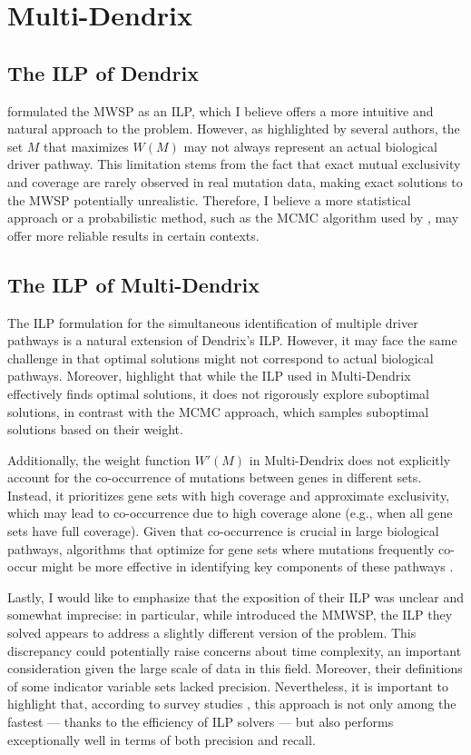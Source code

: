 \section{Multi-Dendrix}

\subsection{The ILP of Dendrix}

\textcite{multi-dendrix} formulated the MWSP as an ILP, which I believe offers a more intuitive and natural approach to the problem. However, as highlighted by several authors, the set $M$ that maximizes $W(M)$ may not always represent an actual biological driver pathway. This limitation stems from the fact that exact mutual exclusivity and coverage are rarely observed in real mutation data, making exact solutions to the MWSP potentially unrealistic. Therefore, I believe a more statistical approach or a probabilistic method, such as the MCMC algorithm used by \textcite{dendrix}, may offer more reliable results in certain contexts.

\subsection{The ILP of Multi-Dendrix}

The ILP formulation for the simultaneous identification of multiple driver pathways is a natural extension of Dendrix's ILP. However, it may face the same challenge in that optimal solutions might not correspond to actual biological pathways. Moreover, \textcite{multi-dendrix} highlight that while the ILP used in Multi-Dendrix effectively finds optimal solutions, it does not rigorously explore suboptimal solutions, in contrast with the MCMC approach, which samples suboptimal solutions based on their weight.

Additionally, the weight function $W'(M)$ in Multi-Dendrix does not explicitly account for the co-occurrence of mutations between genes in different sets. Instead, it prioritizes gene sets with high coverage and approximate exclusivity, which may lead to co-occurrence due to high coverage alone (e.g., when all gene sets have full coverage). Given that co-occurrence is crucial in large biological pathways, algorithms that optimize for gene sets where mutations frequently co-occur might be more effective in identifying key components of these pathways \cite{multi-dendrix}.

Lastly, I would like to emphasize that the exposition of their ILP was unclear and somewhat imprecise: in particular, while \textcite{multi-dendrix} introduced the MMWSP, the ILP they solved appears to address a slightly different version of the problem. This discrepancy could potentially raise concerns about time complexity, an important consideration given the large scale of data in this field. Moreover, their definitions of some indicator variable sets lacked precision. Nevertheless, it is important to highlight that, according to survey studies \cite{survey}, this approach is not only among the fastest --- thanks to the efficiency of ILP solvers --- but also performs exceptionally well in terms of both precision and recall.

